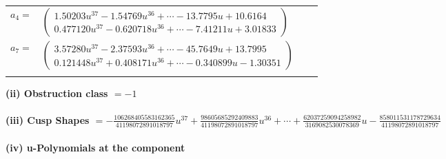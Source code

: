 \documentclass[1p]{elsarticle_modified}
\theoremstyle{definition}
\begin{document}
\begin{tabular}{m{7pt} m{180pt} m{7pt} m{180pt} }
\flushright $a_{4}=$&$\begin{pmatrix}1.50203 u^{37}-1.54769 u^{36}+\cdots-13.7795 u+10.6164\\0.477120 u^{37}-0.620718 u^{36}+\cdots-7.41211 u+3.01833\end{pmatrix}$ \\
\flushright $a_{7}=$&$\begin{pmatrix}3.57280 u^{37}-2.37593 u^{36}+\cdots-45.7649 u+13.7995\\0.121448 u^{37}+0.408171 u^{36}+\cdots-0.340899 u-1.30351\end{pmatrix}$\\&\end{tabular}
\flushleft \textbf{(ii) Obstruction class $= -1$}\\~\\
\flushleft \textbf{(iii) Cusp Shapes $= -\frac{106268405583162365}{41198072891018797} u^{37}+\frac{98605685292409883}{41198072891018797} u^{36}+\cdots+\frac{62037259094258982}{3169082530078369} u-\frac{858011531178729634}{41198072891018797}$}\\~\\
\newpage\renewcommand{\arraystretch}{1}
\flushleft \textbf{(iv) u-Polynomials at the component}\newline \\
\end{document}

